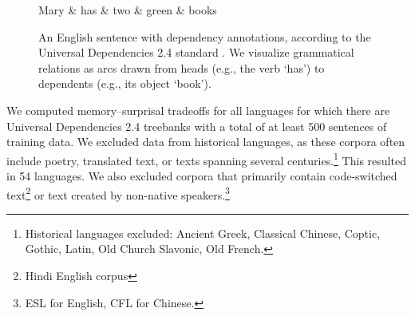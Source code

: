 \begin{figure}
\centering
\begin{dependency}[theme = simple]
   \begin{deptext}[column sep=1em]
Mary \&	 has \& two \& green \& books  \\
   \end{deptext}
\end{dependency}
	\caption{An English sentence with dependency annotations, according to the Universal Dependencies 2.4 standard \citep{nivre-universal-2017}.
	We visualize grammatical relations as arcs drawn from heads (e.g., the verb `has') to dependents (e.g., its object `book').
	}\label{fig:dependency}
\end{figure}

We computed memory--surprisal tradeoffs for all languages for which there are Universal Dependencies 2.4 treebanks with a total of at least 500 sentences of training data.
We excluded data from historical languages, as these corpora often include poetry, translated text, or texts spanning several centuries.\footnote{Historical languages excluded: Ancient Greek, Classical Chinese, Coptic, Gothic, Latin, Old Church Slavonic, Old French.}
This resulted in 54 languages.
We also excluded corpora that primarily contain code-switched text\footnote{Hindi English corpus} or text created by non-native speakers.\footnote{ESL for English, CFL for Chinese.}


